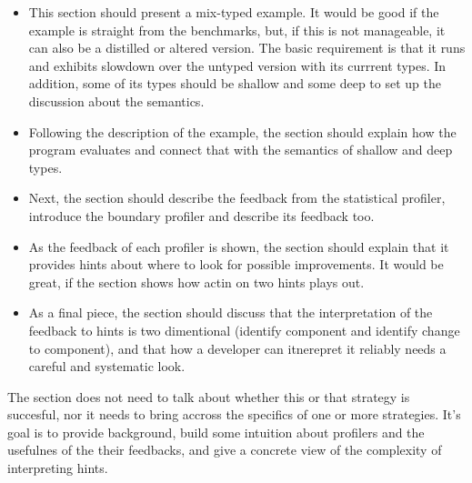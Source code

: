 \begin{itemize}
  \item This section should present a mix-typed example. It would be good
    if the example is straight from the benchmarks, but, if this is not
    manageable, it can also be a distilled or altered version.  The basic
    requirement is that it runs and exhibits slowdown over the untyped
    version with its currrent types. In addition, some of its types should
    be shallow and some deep to set up the discussion about the
    semantics.
  \item Following the description of the example,  
    the section should explain how the program evaluates and connect that with the
    semantics of shallow and deep types. 
  \item Next, the section should describe the feedback from the statistical
    profiler, introduce the boundary profiler  and 
    describe its feedback too. 
  \item As the feedback of each profiler is shown, the section should 
    explain that it provides hints about where to look for
    possible improvements. It would be great, if the section shows how
    actin on two hints plays out.  
  \item As a final piece, the section should discuss that the
    interpretation
    of the feedback to hints is two dimentional (identify component and
    identify change to component), and that how a developer can itnerepret
    it reliably needs a careful and systematic look.
\end{itemize}


The section does not need to talk about whether this or that strategy is
succesful, nor it needs to bring accross the specifics of one or more
strategies. It's goal is to provide background, build some intuition about
profilers and the usefulnes of the their feedbacks, and give a concrete view of
 the complexity of interpreting hints.


